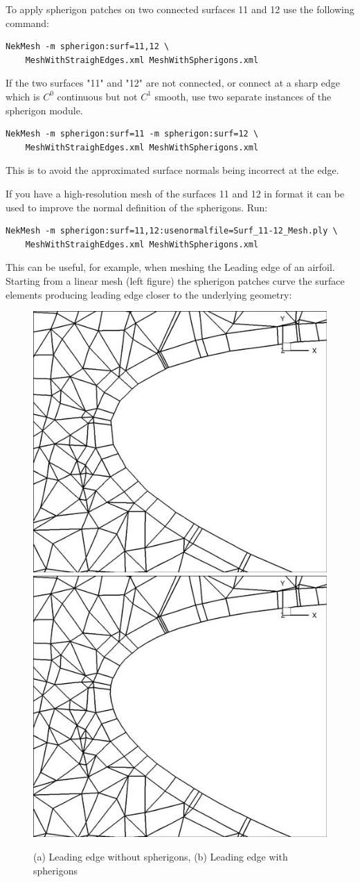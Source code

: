 To apply spherigon patches on two connected surfaces 11 and 12 use the following
command:
%
\begin{lstlisting}[style=BashInputStyle]
NekMesh -m spherigon:surf=11,12 \
    MeshWithStraighEdges.xml MeshWithSpherigons.xml
\end{lstlisting}
%
If the two surfaces "11" and "12" are not connected, or connect at a sharp edge
which is $C^0$ continuous but not $C^1$ smooth, use two separate instances of
the spherigon module.
%
\begin{lstlisting}[style=BashInputStyle]
NekMesh -m spherigon:surf=11 -m spherigon:surf=12 \
    MeshWithStraighEdges.xml MeshWithSpherigons.xml
\end{lstlisting}
%
This is to avoid the approximated surface normals being incorrect at the edge.

If you have a high-resolution mesh of the surfaces 11 and 12 in \inltt{ply}
format it can be used to improve the normal definition of the spherigons. Run:
\begin{lstlisting}[style=BashInputStyle]
NekMesh -m spherigon:surf=11,12:usenormalfile=Surf_11-12_Mesh.ply \
    MeshWithStraighEdges.xml MeshWithSpherigons.xml
\end{lstlisting}

This can be useful, for example, when meshing the Leading edge of an
airfoil. Starting from a linear mesh (left figure) the spherigon patches curve
the surface elements producing leading edge closer to the underlying geometry:

\begin{figure}[!htbp]
  \begin{center}
    \includegraphics[width = 0.47 \textwidth]{img/noSphnoBL.jpg}
    \includegraphics[width = 0.47 \textwidth]{img/SphnoBL.jpg}
    \caption{(a) Leading edge without spherigons, (b) Leading edge with
      spherigons}
  \end{center}
\end{figure}

